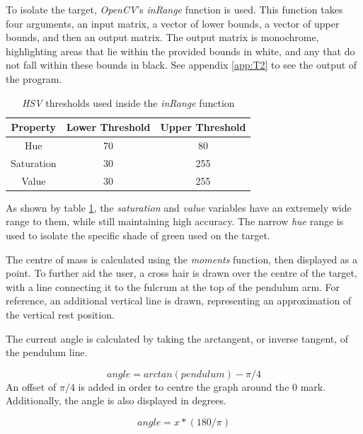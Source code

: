 \documentclass[conference]{IEEEtran}
\begin{document}
To isolate the target, \textit{OpenCV}'s \textit{inRange} function is used. This function takes four arguments, an input matrix, a vector of lower bounds, a vector of upper bounds, and then an output matrix. The output matrix is monochrome, highlighting areas that lie within the provided bounds in white, and any that do not fall within these bounds in black. See appendix \ref{app:T2} to see the output of the program.

\begin{table}[H]
\caption{\textit{HSV} thresholds used inside the \textit{inRange} function}
\label{tab:t2thresholds}
\centering
\begin{tabular}{|c||c|c|}
\hline
Property & Lower Threshold & Upper Threshold\\
\hline
Hue & 70 & 80\\
\hline
Saturation & 30 & 255\\
\hline
Value & 30 & 255\\
\hline
\end{tabular}
\end{table}

As shown by table \ref{tab:t2thresholds}, the \textit{saturation} and \textit{value} variables have an extremely wide range to them, while still maintaining high accuracy. The narrow \textit{hue} range is used to isolate the specific shade of green used on the target.

The centre of mass is calculated using the \textit{moments} function, then displayed as a point. To further aid the user, a cross hair is drawn over the centre of the target, with a line connecting it to the fulcrum at the top of the pendulum arm. For reference, an additional vertical line is drawn, representing an approximation of the vertical rest position.

The current angle is calculated by taking the arctangent, or inverse tangent, of the pendulum line.

\begin{equation}
angle = arctan(pendulum) - \pi /4
\end{equation}
An offset of $\pi /4$ is added in order to centre the graph around the 0 mark. Additionally, the angle is also displayed in degrees.

\begin{equation}
angle = x*(180/\pi )
\end{equation}
\end{document}
